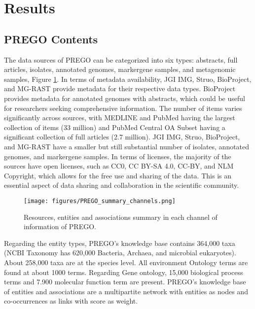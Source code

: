 \section{Results}
\label{sec:prego-results}

   \subsection{PREGO Contents}
   \label{subsec:prego-contents}

The data sources of PREGO can be categorized into six types: abstracts, full articles,
isolates, annotated genomes, markergene samples, and metagenomic samples, Figure \ref{fig:prego-summary}.
In terms of metadata availability, JGI IMG, Struo, BioProject, and MG-RAST provide
metadata for their respective data types.
BioProject provides metadata for annotated genomes with abstracts, which could be useful for researchers seeking comprehensive information.
The number of items varies significantly across sources, with MEDLINE and PubMed
having the largest collection of items (33 million) and PubMed Central OA Subset
having a significant collection of full articles (2.7 million).
JGI IMG, Struo, BioProject, and MG-RAST have a smaller but still substantial number of isolates, annotated genomes, and markergene samples.
In terms of licenses, the majority of the sources have open licenses,
such as CC0, CC BY-SA 4.0, CC-BY, and NLM Copyright, which allows for the free
use and sharing of the data. This is an essential aspect of data sharing and
collaboration in the scientific community.

   \begin{figure}[hbt!]
      \centering
      \texttt{[image: figures/PREGO\_summary\_channels.png]}
      \caption[PREGO contents summary]{
         Resources, entities and associations summary in each channel of information of PREGO.}
      \label{fig:prego-summary}
   \end{figure}

Regarding the entity types, PREGO's knowledge base contains 364,000 taxa
(NCBI Taxonomy has 620,000 Bacteria, Archaea, and microbial eukaryotes). 
About 258,000 taxa are at the species level. 
All environment Ontology terms are found at about 1000 terms. Regarding Gene ontology, 15,000 biological process terms and 7.900 molecular function term are present.
PREGO's knowledge base of entities and associations are a multipartite network
with entities as nodes and co-occurrences as links with score as weight.

